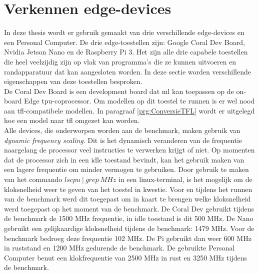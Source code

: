 \section{Verkennen edge-devices}

In deze thesis wordt er gebruik gemaakt van drie verschillende edge-devices en een Personal Computer. De drie edge-toestellen zijn: Google Coral Dev Board, Nvidia Jetson Nano en de Raspberry Pi 3. Het zijn alle drie capabele toestellen die heel veelzijdig zijn op vlak van programma's die ze kunnen uitvoeren en randapparatuur dat kan aangesloten worden. In deze sectie worden verschillende eigenschappen van deze toestellen besproken. \\
De Coral Dev Board is een development board dat \gls{ml} kan toepassen op de on-board Edge \gls{tpu}-coprocessor. Om modellen op dit toestel te runnen is er wel nood aan \gls{tfl}-compatibele modellen. In paragraaf \ref{prg:ConversieTFL} wordt er uitgelegd hoe een model naar \gls{tfl} omgezet kan worden. \\
Alle devices, die onderworpen worden aan de benchmark, maken gebruik van \textit{dynamic frequency scaling}. Dit is het dynamisch veranderen van de frequentie naargelang de processor veel instructies te verwerken krijgt of niet. Op momenten dat de processor zich in een idle toestand bevindt, kan het gebruik maken van een lagere frequentie om minder vermogen te gebruiken. Door gebruik te maken van het commando $lscpu~|~grep~ MHz$ in een linux-terminal, is het mogelijk om de kloksnelheid weer te geven van het toestel in kwestie. Voor en tijdens het runnen van de benchmark werd dit toegepast om in kaart te brengen welke kloksnelheid werd toegepast op het moment van de benchmark. De Coral Dev gebruikt tijdens de benchmark de 1500 MHz frequentie, in idle toestand is dit 500 MHz. De Nano gebruikt een gelijkaardige kloksnelheid tijdens de benchmark: 1479 MHz. Voor de benchmark bedroeg deze frequentie 102 MHz. De Pi gebruikt dan weer 600 MHz in ruststand en 1200 MHz gedurende de benchmark. De gebruikte Personal Computer benut een klokfrequentie van 2500 MHz in rust en 3250 MHz tijdens de benchmark. \\
